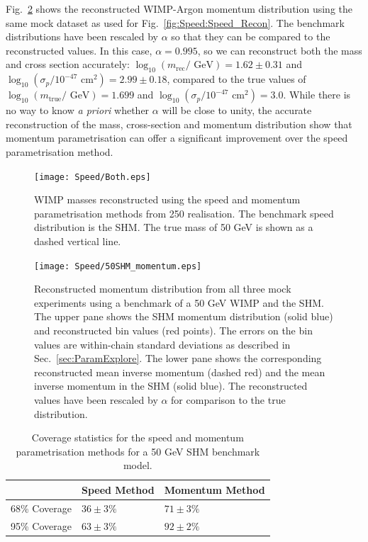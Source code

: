 Fig.\ \ref{fig:Speed:50SHM_momentum} shows the reconstructed WIMP-Argon momentum distribution using the same mock dataset as used for Fig.\ \ref{fig:Speed:Speed_Recon}. The benchmark distributions have been rescaled by \(\alpha\) so that they can be compared to the reconstructed values. In this case, \(\alpha = 0.995\), so we can reconstruct both the mass and cross section accurately: \(\log_{10} (m_\textrm{rec} / \textrm{ GeV}) = 1.62 \pm 0.31\) and \(\log_{10} (\sigma_p / 10^{-47} \textrm{ cm}^2) = 2.99 \pm 0.18\), compared to the true values of \(\log_{10} (m_\textrm{true} / \textrm{ GeV}) = 1.699\) and \(\log_{10} (\sigma_p / 10^{-47} \textrm{ cm}^2) = 3.0\). While there is no way to know \textit{a priori} whether \(\alpha\) will be close to unity, the accurate reconstruction of the mass, cross-section and momentum distribution show that momentum parametrisation can offer a significant improvement over the speed parametrisation method.

\begin{figure}[t]
\centering
  \texttt{[image: Speed/Both.eps]}
  \caption[Comparison of WIMP masses reconstructed using the binned speed and momentum parametrisations]{WIMP masses reconstructed using the speed and momentum parametrisation methods from 250 realisation. The benchmark speed distribution is the SHM. The true mass of 50 GeV is shown as a dashed vertical line.}
  \label{fig:Speed:both}
\end{figure}

\begin{figure}[t]
\centering
  \texttt{[image: Speed/50SHM\_momentum.eps]}
\caption[Reconstructed momentum distribution from all three mock experiments using a benchmark of a 50 GeV WIMP and the SHM]{Reconstructed momentum distribution from all three mock experiments using a benchmark of a 50 GeV WIMP and the SHM. The upper pane shows the SHM momentum distribution (solid blue) and reconstructed bin values (red points). The errors on the bin values are within-chain standard deviations as described in Sec.\ \ref{sec:ParamExplore}.  The lower pane shows the corresponding reconstructed mean inverse momentum (dashed red) and the mean inverse momentum in the SHM (solid blue). The reconstructed values have been rescaled by \(\alpha\) for comparison to the true distribution.}
  \label{fig:Speed:50SHM_momentum}
\end{figure}

\begin{table}[t]
  \begin{center}
    \begin{tabular}{lll}
    \hline\hline
    & Speed Method & Momentum Method \\
    \hline
    68\% Coverage & \(36 \pm 3 \%\) & \(71 \pm 3 \%\) \\
    95\% Coverage & \(63 \pm 3\%\) & \(92 \pm 2 \%\) \\
    \hline\hline
    \end{tabular}
  \end{center}
  \caption{Coverage statistics for the speed and momentum parametrisation methods for a 50 GeV SHM benchmark model.}
\label{tab:CoverageComparison}
\end{table}

